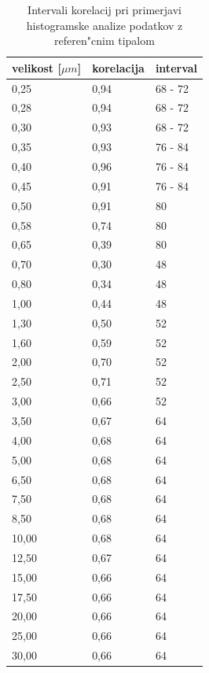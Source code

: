 \documentclass[11pt,a4paper]{article}
\begin{document}
\begin{table}[H]
	\centering
	\begin{tabular}{lll}
		velikost [$\mu m$] & korelacija & interval \\
		\hline
		0,25 & 0,94 & 68 - 72 \\
		0,28 & 0,94 & 68 - 72 \\
		0,30 & 0,93 & 68 - 72 \\
		0,35 & 0,93 & 76 - 84 \\
		0,40 & 0,96 & 76 - 84 \\
		0,45 & 0,91 & 76 - 84 \\
		0,50 & 0,91 & 80 \\
		0,58 & 0,74 & 80 \\
		0,65 & 0,39 & 80 \\
		0,70 & 0,30 & 48 \\
		0,80 & 0,34 & 48 \\
		1,00 & 0,44 & 48 \\
		1,30 & 0,50 & 52 \\
		1,60 & 0,59 & 52 \\
		2,00 & 0,70 & 52 \\
		2,50 & 0,71 & 52 \\
		3,00 & 0,66 & 52 \\
		3,50 & 0,67 & 64 \\
		4,00 & 0,68 & 64 \\
		5,00 & 0,68 & 64 \\
		6,50 & 0,68 & 64 \\
		7,50 & 0,68 & 64 \\
		8,50 & 0,68 & 64 \\
		10,00 & 0,68 & 64 \\
		12,50 & 0,67 & 64 \\
		15,00 & 0,66 & 64 \\
		17,50 & 0,66 & 64 \\
		20,00 & 0,66 & 64 \\
		25,00 & 0,66 & 64 \\
		30,00 & 0,66 & 64
		
	\end{tabular}
	\caption{Intervali korelacij pri primerjavi histogramske analize podatkov z referen"cnim tipalom}
	\label{table:correlations}
	\def\arraystretch{1}
\end{table}
\end{document}

